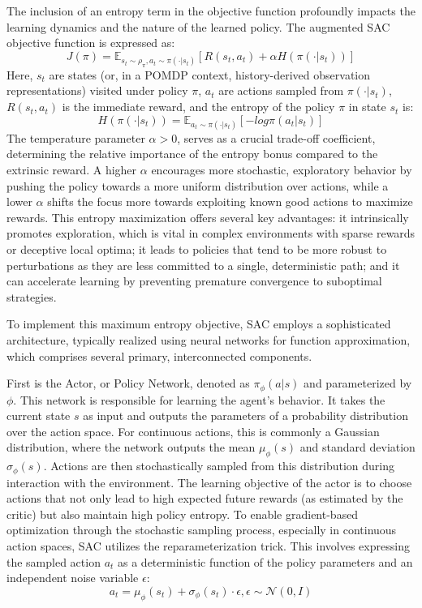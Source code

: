 The inclusion of an entropy term in the objective function profoundly impacts the learning dynamics and the nature of the learned policy. The augmented \gls{SAC} objective function is expressed as:
\[J(\pi) = \mathbb{E}_{s_t \sim \rho_\pi, a_t \sim \pi(\cdot|s_t)} [R(s_t, a_t) + \alpha H(\pi(\cdot|s_t))]\]
Here, \(s_t\) are states (or, in a \gls{POMDP} context, history-derived observation representations) visited under policy \(\pi\), \(a_t\) are actions sampled from \(\pi(\cdot|s_t)\), \(R(s_t, a_t)\) is the immediate reward, and the entropy of the policy \(\pi\) in state \(s_t\) is:
\[H(\pi(\cdot|s_t)) = \mathbb{E}_{a_t \sim \pi(\cdot|s_t)}[-log \pi(a_t|s_t)]\] 
The temperature parameter \(\alpha > 0\), serves as a crucial trade-off coefficient, determining the relative importance of the entropy bonus compared to the extrinsic reward. A higher \(\alpha\) encourages more stochastic, exploratory behavior by pushing the policy towards a more uniform distribution over actions, while a lower \(\alpha\) shifts the focus more towards exploiting known good actions to maximize rewards. This entropy maximization offers several key advantages: it intrinsically promotes exploration, which is vital in complex environments with sparse rewards or deceptive local optima; it leads to policies that tend to be more robust to perturbations as they are less committed to a single, deterministic path; and it can accelerate learning by preventing premature convergence to suboptimal strategies.

To implement this maximum entropy objective, \gls{SAC} employs a sophisticated architecture, typically realized using neural networks for function approximation, which comprises several primary, interconnected components.

First is the Actor, or Policy Network, denoted as \(\pi_\phi(a|s)\) and parameterized by \(\phi\). This network is responsible for learning the agent's behavior. It takes the current state \(s\) as input and outputs the parameters of a probability distribution over the action space. For continuous actions, this is commonly a Gaussian distribution, where the network outputs the mean \(\mu_\phi(s)\) and standard deviation \(\sigma_\phi(s)\). Actions are then stochastically sampled from this distribution during interaction with the environment. The  learning objective of the actor is to choose actions that not only lead to high expected future rewards (as estimated by the critic) but also maintain high policy entropy. To enable gradient-based optimization through the stochastic sampling process, especially in continuous action spaces, \gls{SAC} utilizes the reparameterization trick. This involves expressing the sampled action \(a_t\) as a deterministic function of the policy parameters and an independent noise variable \(\epsilon\): 
\[a_t = \mu_\phi(s_t) + \sigma_\phi(s_t) \cdot \epsilon, \epsilon \sim \mathcal{N}(0,I)\]

